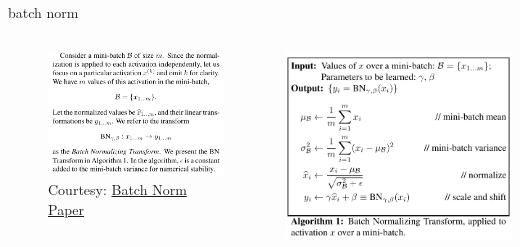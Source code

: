 \documentclass[aspectratio=169,xcolor={dvipsnames,svgnames}]{beamer}
\begin{document}
\begin{frame}[label={sec:batch-norm}]{batch norm}
\begin{columns}
\begin{column}{0.5\columnwidth}
\begin{figure}[htbp]
\centering
\includegraphics[width=.9\linewidth]{org-download-images/details/2024-09-16_23-14-37_screenshot.png}
\caption{\label{fig:batch-norm}Courtesy: \href{https://arxiv.org/abs/1502.03167}{Batch Norm Paper}}
\end{figure}
\end{column}

\begin{column}{0.5\columnwidth}
\begin{center}
\includegraphics[width=.9\linewidth]{org-download-images/details/2024-09-16_23-15-12_screenshot.png}
\end{center}
\end{column}
\end{columns}
\end{frame}
\end{document}
